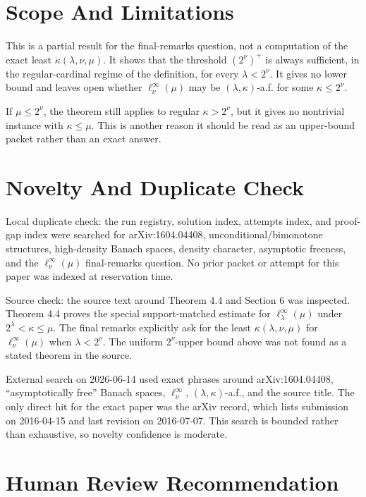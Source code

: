 \documentclass[11pt]{article}
\begin{document}
\section*{Scope And Limitations}

This is a partial result for the final-remarks question, not a computation of
the exact least \(\kappa(\lambda,\nu,\mu)\).  It shows that the threshold
\((2^\nu)^+\) is always sufficient, in the regular-cardinal regime of the
definition, for every \(\lambda<2^\nu\).  It gives no lower bound and leaves
open whether \(\ell_\nu^\infty(\mu)\) may be \((\lambda,\kappa)\)-a.f. for
some \(\kappa\leq 2^\nu\).

If \(\mu\leq 2^\nu\), the theorem still applies to regular
\(\kappa>2^\nu\), but it gives no nontrivial instance with
\(\kappa\leq\mu\).  This is another reason it should be read as an upper-bound
packet rather than an exact answer.

\section*{Novelty And Duplicate Check}

Local duplicate check: the run registry, solution index, attempts index, and
proof-gap index were searched for arXiv:1604.04408, unconditional/bimonotone
structures, high-density Banach spaces, density character, asymptotic
freeness, and the \(\ell_\nu^\infty(\mu)\) final-remarks question.  No prior
packet or attempt for this paper was indexed at reservation time.

Source check: the source text around Theorem 4.4 and Section 6 was inspected.
Theorem 4.4 proves the special support-matched estimate for
\(\ell_\lambda^\infty(\mu)\) under \(2^\lambda<\kappa\leq\mu\).  The final
remarks explicitly ask for the least \(\kappa(\lambda,\nu,\mu)\) for
\(\ell_\nu^\infty(\mu)\) when \(\lambda<2^\nu\).  The uniform
\(2^\nu\)-upper bound above was not found as a stated theorem in the source.

External search on 2026-06-14 used exact phrases around arXiv:1604.04408,
``asymptotically free'' Banach spaces, \(\ell_\nu^\infty\),
\((\lambda,\kappa)\)-a.f., and the source title.  The only direct hit for the
exact paper was the arXiv record, which lists submission on 2016-04-15 and
last revision on 2016-07-07.  This search is bounded rather than exhaustive,
so novelty confidence is moderate.

\section*{Human Review Recommendation}
\end{document}
